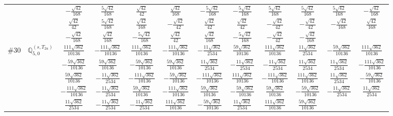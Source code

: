 \documentclass[fleqn,9pt,landscape]{jsarticle}
\begin{document}
\begin{center}
\begin{longtable}{lcccccccccc}
& $ - \frac{\sqrt{42}}{168} $ & $ \frac{5 \sqrt{42}}{168} $ & $ \frac{\sqrt{42}}{42} $ & $ \frac{\sqrt{42}}{168} $ & $ - \frac{5 \sqrt{42}}{168} $ & $ - \frac{5 \sqrt{42}}{168} $ & $ \frac{5 \sqrt{42}}{168} $ & $ \frac{5 \sqrt{42}}{168} $ & $ \frac{5 \sqrt{42}}{168} $ & $ - \frac{\sqrt{42}}{168} $ \\
& $ \frac{\sqrt{42}}{42} $ & $ \frac{5 \sqrt{42}}{168} $ & $ \frac{\sqrt{42}}{168} $ & $ - \frac{\sqrt{42}}{42} $ & $ \frac{\sqrt{42}}{42} $ & $ \frac{\sqrt{42}}{42} $ & $ - \frac{\sqrt{42}}{42} $ & $ - \frac{\sqrt{42}}{42} $ & $ - \frac{\sqrt{42}}{168} $ & $ \frac{\sqrt{42}}{168} $ \\
& $ - \frac{\sqrt{42}}{168} $ & $ \frac{\sqrt{42}}{168} $ & $ - \frac{5 \sqrt{42}}{168} $ & $ \frac{\sqrt{42}}{42} $ & $ \frac{\sqrt{42}}{168} $ & $ - \frac{5 \sqrt{42}}{168} $ & $ - \frac{\sqrt{42}}{42} $ & $ - \frac{\sqrt{42}}{168} $ & $  $ & $  $ \\ \hline
$ \#30\quad \mathbb{Q}_{5,0}^{(s,T_{2u})} $ & $ \frac{111 \sqrt{362}}{10136} $ & $ - \frac{111 \sqrt{362}}{10136} $ & $ \frac{111 \sqrt{362}}{10136} $ & $ - \frac{111 \sqrt{362}}{10136} $ & $ - \frac{11 \sqrt{362}}{2534} $ & $ \frac{59 \sqrt{362}}{10136} $ & $ \frac{111 \sqrt{362}}{10136} $ & $ \frac{11 \sqrt{362}}{2534} $ & $ - \frac{59 \sqrt{362}}{10136} $ & $ \frac{111 \sqrt{362}}{10136} $ \\
& $ - \frac{59 \sqrt{362}}{10136} $ & $ \frac{59 \sqrt{362}}{10136} $ & $ - \frac{59 \sqrt{362}}{10136} $ & $ \frac{59 \sqrt{362}}{10136} $ & $ \frac{11 \sqrt{362}}{2534} $ & $ - \frac{11 \sqrt{362}}{2534} $ & $ - \frac{11 \sqrt{362}}{2534} $ & $ \frac{11 \sqrt{362}}{2534} $ & $ \frac{11 \sqrt{362}}{2534} $ & $ - \frac{111 \sqrt{362}}{10136} $ \\
& $ \frac{59 \sqrt{362}}{10136} $ & $ - \frac{11 \sqrt{362}}{2534} $ & $ - \frac{111 \sqrt{362}}{10136} $ & $ - \frac{59 \sqrt{362}}{10136} $ & $ - \frac{111 \sqrt{362}}{10136} $ & $ \frac{111 \sqrt{362}}{10136} $ & $ - \frac{111 \sqrt{362}}{10136} $ & $ \frac{111 \sqrt{362}}{10136} $ & $ \frac{11 \sqrt{362}}{2534} $ & $ - \frac{59 \sqrt{362}}{10136} $ \\
& $ - \frac{111 \sqrt{362}}{10136} $ & $ - \frac{11 \sqrt{362}}{2534} $ & $ \frac{59 \sqrt{362}}{10136} $ & $ - \frac{111 \sqrt{362}}{10136} $ & $ \frac{59 \sqrt{362}}{10136} $ & $ - \frac{59 \sqrt{362}}{10136} $ & $ \frac{59 \sqrt{362}}{10136} $ & $ - \frac{59 \sqrt{362}}{10136} $ & $ - \frac{11 \sqrt{362}}{2534} $ & $ \frac{11 \sqrt{362}}{2534} $ \\
& $ \frac{11 \sqrt{362}}{2534} $ & $ - \frac{11 \sqrt{362}}{2534} $ & $ - \frac{11 \sqrt{362}}{2534} $ & $ \frac{111 \sqrt{362}}{10136} $ & $ - \frac{59 \sqrt{362}}{10136} $ & $ \frac{11 \sqrt{362}}{2534} $ & $ \frac{111 \sqrt{362}}{10136} $ & $ \frac{59 \sqrt{362}}{10136} $ & $  $ & $  $ \\ \hline

\end{longtable}
\end{center}
\end{document}
